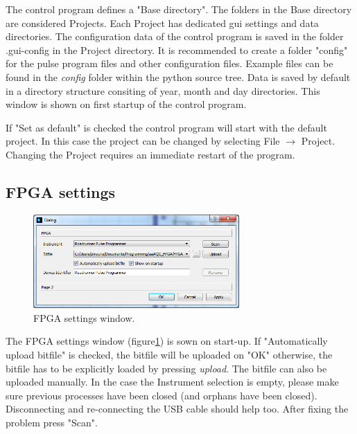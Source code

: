 \documentclass[11pt]{scrartcl}
\begin{document}
The control program defines a "Base directory". The folders in the Base directory are considered Projects. Each Project has dedicated gui settings and data directories. The configuration data of the control program is saved in the folder .gui-config in the Project directory. It is recommended to create a folder "config" for the pulse program files and other configuration files. Example files can be found in the {\em config} folder within the python source tree. Data is saved by default in a directory structure consiting of year, month and day directories. This window is shown on first startup of the control program.

If "Set as default" is checked the control program will start with the default project. In this case the project can be changed by selecting File $\rightarrow$ Project. Changing the Project requires an immediate restart of the program.

\subsection{FPGA settings}
\begin{figure}[htbp]
\begin{center}
\includegraphics[width=0.7\textwidth]{FPGASettings}
\end{center}
\caption{\label{FPGASettings} FPGA settings window.}
\end{figure}
The FPGA settings window (figure\ref{FPGASettings}) is sown on start-up. If "Automatically upload bitfile" is checked, the bitfile will be uploaded on "OK" otherwise, the bitfile has to be explicitly loaded by pressing {\em upload}. The bitfile can also be uploaded manually. In the case the Instrument selection is empty, please make sure previous processes have been closed (and orphans have been closed). Disconnecting and re-connecting the USB cable should help too. After fixing the problem press "Scan".
\end{document}
